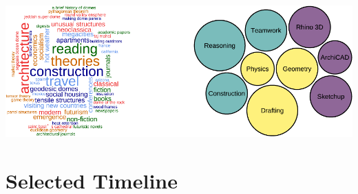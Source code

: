 \documentclass[11pt, a4paper]{awesome-cv}
\begin{document}
\begin{geoentries}


\end{geoentries}

\vspace{-0.5cm}

\begin{center}\includegraphics{DataDrivenResume_files/figure-latex/unnamed-chunk-15-1} \end{center}

\newpage

\hypertarget{selected-timeline}{%
\section{\texorpdfstring{ Selected
Timeline}{ Selected Timeline}}\label{selected-timeline}}
\end{document}
